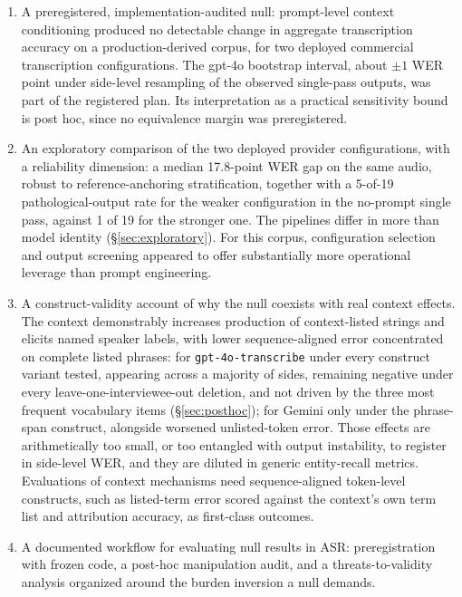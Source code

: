 \documentclass[11pt]{article}
\begin{document}
\begin{enumerate}
\item A preregistered, implementation-audited null: prompt-level context conditioning produced no detectable change in aggregate transcription accuracy on a production-derived corpus, for two deployed commercial transcription configurations. The gpt-4o bootstrap interval, about $\pm 1$ WER point under side-level resampling of the observed single-pass outputs, was part of the registered plan. Its interpretation as a practical sensitivity bound is post hoc, since no equivalence margin was preregistered.
\item An exploratory comparison of the two deployed provider configurations, with a reliability dimension: a median 17.8-point WER gap on the same audio, robust to reference-anchoring stratification, together with a 5-of-19 pathological-output rate for the weaker configuration in the no-prompt single pass, against 1 of 19 for the stronger one. The pipelines differ in more than model identity (\S\ref{sec:exploratory}). For this corpus, configuration selection and output screening appeared to offer substantially more operational leverage than prompt engineering.
\item A construct-validity account of why the null coexists with real context effects. The context demonstrably increases production of context-listed strings and elicits named speaker labels, with lower sequence-aligned error concentrated on complete listed phrases: for \texttt{gpt-4o-transcribe} under every construct variant tested, appearing across a majority of sides, remaining negative under every leave-one-interviewee-out deletion, and not driven by the three most frequent vocabulary items (\S\ref{sec:posthoc}); for Gemini only under the phrase-span construct, alongside worsened unlisted-token error. Those effects are arithmetically too small, or too entangled with output instability, to register in side-level WER, and they are diluted in generic entity-recall metrics. Evaluations of context mechanisms need sequence-aligned token-level constructs, such as listed-term error scored against the context's own term list and attribution accuracy, as first-class outcomes.
\item A documented workflow for evaluating null results in ASR: preregistration with frozen code, a post-hoc manipulation audit, and a threats-to-validity analysis organized around the burden inversion a null demands.
\end{enumerate}
\end{document}

